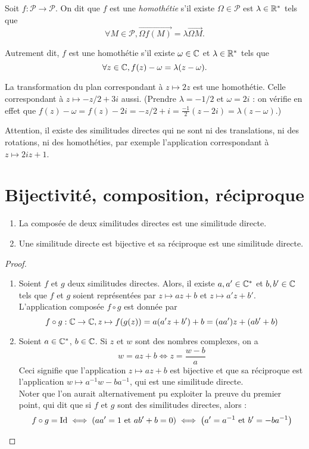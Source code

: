 \begin{definition}
Soit $f : \mathcal P \to \mathcal P$. On dit que $f$ est une \emph{homothétie} s'il existe $\Omega\in\mathcal P$ est $\lambda\in\mathbb{R}^*$ tels que
\[ \forall M\in\mathcal P, \overrightarrow{\Omega f(M)} = \lambda \overrightarrow{\Omega M}.\]

Autrement dit, $f$ est une homothétie s'il existe $\omega\in\mathbb{C}$ et $\lambda\in\mathbb{R}^*$ tels que
\[ \forall z\in\mathbb{C}, f(z)-\omega=\lambda(z-\omega).\]
\end{definition}

\begin{exemple}
La transformation du plan correspondant à $z\mapsto 2z$ est une homothétie. Celle correspondant à $z\mapsto -z/2+3i$ aussi. (Prendre $\lambda=-1/2$ et $\omega=2i$ : on vérifie en effet que $f(z)-\omega = f(z)-2i = -z/2+i=\frac{-1}{2}(z-2i)=\lambda(z-\omega)$.)
\end{exemple}

\begin{mdframed}
Attention, il existe des similitudes directes qui ne sont ni des translations, ni des rotations, ni des homothéties, par exemple l'application correspondant à $z\mapsto 2iz+1$.
\end{mdframed}

\section{Bijectivité, composition, réciproque}

\begin{proposition}
\begin{enumerate}
\item La composée de deux similitudes directes est une similitude directe.
\item Une similitude directe est bijective et sa réciproque est une similitude directe.
\end{enumerate}
\end{proposition}
\begin{proof}
\begin{enumerate}
\item Soient $f$ et $g$ deux similitudes directes. Alors, il existe $a,a'\in\mathbb{C}^*$ et $b, b'\in\mathbb{C}$ tels que $f$ et $g$ soient représentées par $z\mapsto az+b$ et $z\mapsto a'z+b'$. L'application composée $f\circ g$ est donnée par 
\[ f\circ g : \mathbb{C}\to \mathbb{C}, z\mapsto f(g(z))=a(a'z+b')+b=(aa')z+(ab'+b)\]
\item Soient $a\in\mathbb{C}^*$, $b\in \mathbb{C}$. Si $z$ et $w$ sont des nombres complexes, on a
\[ w=az+b \iff z=\frac{w-b}{a}\]
Ceci signifie que l'application $z\mapsto az+b$ est bijective et que sa réciproque est l'application $w\mapsto a^{-1}w-ba^{-1}$, qui est une similitude directe.\\
Noter que l'on aurait alternativement pu exploiter la preuve du premier point, qui dit que si $f$ et $g$ sont des similitudes directes, alors :
\[
f\circ g = \operatorname{Id} 
\iff \left(aa'=1\text{ et } ab'+b=0\right) 
\iff \left(a'=a^{-1}\text{ et } b'=-ba^{-1}\right)
\]
\end{enumerate}
\end{proof}

